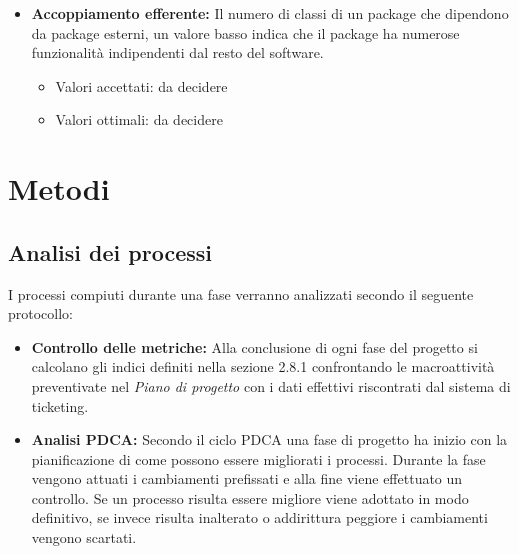 \documentclass[a4paper]{report}
\begin{document}
\begin{itemize}
					\item \textbf{Accoppiamento efferente:}
					Il numero di classi di un package che dipendono da package esterni, un valore basso indica che il package ha 
					numerose funzionalità indipendenti dal resto del software.
						\begin{itemize}
							\item Valori accettati: da decidere
							\item Valori ottimali: da decidere
						\end{itemize}
			\end{itemize}
			
			
		\section{Metodi}
			
			\subsection{Analisi dei processi}
				I processi compiuti durante una fase verranno analizzati secondo il seguente protocollo:
				\begin{itemize}
					\item \textbf{Controllo delle metriche:}
						Alla conclusione di ogni fase del progetto si calcolano gli indici definiti nella sezione 2.8.1 confrontando 
						le macroattività preventivate nel \emph{Piano di progetto} con i dati effettivi riscontrati dal sistema di ticketing.
					\item \textbf{Analisi PDCA:}
						Secondo il ciclo PDCA una fase di progetto ha inizio con la pianificazione di come possono essere migliorati i processi. 
						Durante la fase vengono attuati i cambiamenti prefissati e alla fine viene effettuato un controllo. Se un processo 
						risulta essere migliore viene adottato in modo definitivo, se invece risulta inalterato o addirittura peggiore i 
						cambiamenti vengono scartati.
				\end{itemize}
\end{document}
